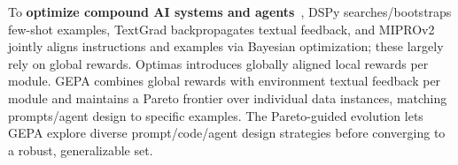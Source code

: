 \documentclass{article} %
\begin{document}
To \textbf{optimize compound AI systems and agents}~\citep{lin2025trainingscaffoldedlanguagemodels}, DSPy \citep{khattab2022demonstrate,dspy} searches/bootstraps few-shot examples, TextGrad \citep{textgrad} backpropagates textual feedback, and MIPROv2 \citep{miprov2} jointly aligns instructions and examples via Bayesian optimization; these largely rely on global rewards.  Optimas \citep{wu2025optimasoptimizingcompoundai} introduces globally aligned local rewards per module. GEPA combines global rewards with environment textual feedback per module and maintains a Pareto frontier over individual data instances, matching prompts/agent design to specific examples. The Pareto-guided evolution lets GEPA explore diverse prompt/code/agent design strategies before converging to a robust, generalizable set.
\end{document}
